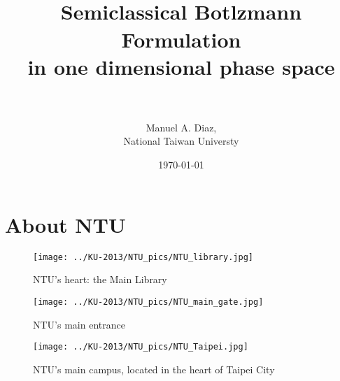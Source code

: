 

\title[Short Title \hspace{4em}\insertframenumber/
\inserttotalframenumber]{~ \\ Semiclassical Botlzmann Formulation \\ in one dimensional phase space \\~} %
\author[M. A. Diaz]{ Manuel A. Diaz, \\ National Taiwan Universty } %
\date{\today}



\begin{frame}
\maketitle
\end{frame}

\section*{About NTU}

\begin{frame}
\begin{figure}
 \centering
 \texttt{[image: ../KU-2013/NTU\_pics/NTU\_library.jpg]}
 \caption{NTU's heart: the Main Library}
 \label{fig:NTU_library}
\end{figure}
\end{frame}

\begin{frame}
\begin{figure}
 \centering
 \texttt{[image: ../KU-2013/NTU\_pics/NTU\_main\_gate.jpg]}
 \caption{NTU's main entrance}
 \label{fig:NTU_main_gate}
\end{figure}
\end{frame}

\begin{frame}
\begin{figure}
 \centering
 \texttt{[image: ../KU-2013/NTU\_pics/NTU\_Taipei.jpg]}
 \caption{NTU's main campus, located in the heart of Taipei City}
 \label{fig:NTU_Taipei}
\end{figure}
\end{frame}

